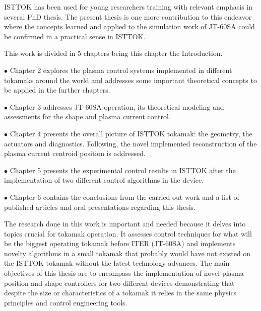 ISTTOK has been used for young researchers training with relevant 
emphasis in several PhD thesis. The present thesis is one more contribution to this endeavor where the concepts learned and applied to the simulation work of JT-60SA  could be confirmed in a practical sense in ISTTOK. \smallskip

This work is divided in 5 chapters being this chapter the Introduction.\smallskip

$\bullet$ Chapter 2 explores the plasma control systems implemented in different tokamaks around the world and addresses some important theoretical concepts to be applied in the further chapters.\smallskip

$\bullet$ Chapter 3 addresses JT-60SA operation, its theoretical modeling and assessments for the shape and plasma current control.\smallskip

$\bullet$ Chapter 4 presents the overall picture of ISTTOK tokamak: the geometry, the actuators and diagnostics. Following, the novel  implemented  reconstruction of the plasma current centroid position is addressed.\smallskip

$\bullet$ Chapter 5  presents the experimental control results in ISTTOK after the implementation of two different control algorithms in the device. \smallskip

$\bullet$ Chapter 6 contains the conclusions from the carried out work and a list of published articles and oral presentations regarding this thesis.\smallskip

The research done in this work is important and needed because it delves into topics crucial for tokamak operation. It assesses control techniques for what will be the biggest operating tokamak before ITER (JT-60SA) and implements novelty algorithms in a small tokamak that probably would have not  existed on the ISTTOK tokamak without the latest technology advances. The main objectives of this thesis are to encompass the implementation of novel  plasma position and shape controllers for two different devices demonstrating that despite the size or characteristics of a tokamak it relies in the same physics principles and control engineering tools.\smallskip 
